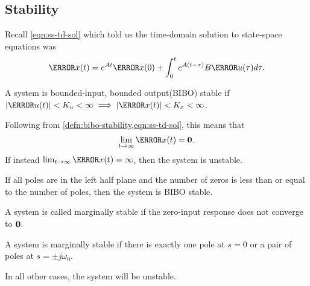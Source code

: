 \subsection{Stability}
Recall \cref{eqn:ss-td-sol} which told us the time-domain solution to state-space equations was
\[
  \V{x}(t) = e^{At}\V{x}(0) + \int_{0}^{t}e^{A(t-\tau)}B\V{u}(\tau)d\tau.
\]
\begin{definition}
  A system is bounded-input, bounded output(BIBO) stable if $|\V{u}(t)| < K_{u} < \infty \implies |\V{x}(t)| < K_x < \infty$.
  \label{defn:bibo-stability}
\end{definition}
Following from \cref{defn:bibo-stability,eqn:ss-td-sol}, this means that
\[
  \lim_{t\to\infty}\V{x}(t) = \bs{0}.
\]
If instead $\lim_{t\to\infty}\V{x}(t) = \infty$, then the system is unstable.
\begin{theorem}
  If all poles are in the left half plane and the number of zeros is less than or equal to the number of poles, then the system is BIBO stable.
  \label{thm:bibo-stability}
\end{theorem}
\begin{definition}
  A system is called marginally stable if the zero-input response does not converge to $\boldsymbol{0}$.
  \label{defn:marginal-stability}
\end{definition}
\begin{theorem}
  A system is marginally stable if there is exactly one pole at $s=0$ or a pair of poles at $s=\pm j\omega_0$.
  \label{thm:marginal-stability}
\end{theorem}
In all other cases, the system will be unstable.
